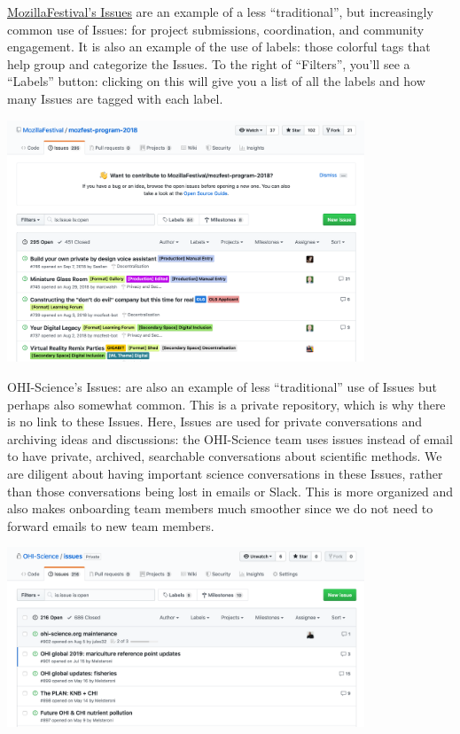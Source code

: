 \documentclass[
  letterpaper,
  DIV=11,
  numbers=noendperiod]{scrreprt}
\begin{document}
\href{https://github.com/MozillaFestival/mozfest-program-2018/issues}{MozillaFestival's
Issues} are an example of a less ``traditional'', but increasingly
common use of Issues: for project submissions, coordination, and
community engagement. It is also an example of the use of labels: those
colorful tags that help group and categorize the Issues. To the right of
``Filters'', you'll see a ``Labels'' button: clicking on this will give
you a list of all the labels and how many Issues are tagged with each
label.

\includegraphics[width=0.8\textwidth,height=\textheight]{./img/issues-mozfest.png}

OHI-Science's Issues: are also an example of less ``traditional'' use of
Issues but perhaps also somewhat common. This is a private repository,
which is why there is no link to these Issues. Here, Issues are used for
private conversations and archiving ideas and discussions: the
OHI-Science team uses issues instead of email to have private, archived,
searchable conversations about scientific methods. We are diligent about
having important science conversations in these Issues, rather than
those conversations being lost in emails or Slack. This is more
organized and also makes onboarding team members much smoother since we
do not need to forward emails to new team members.

\includegraphics[width=0.8\textwidth,height=\textheight]{./img/issues-ohiscience.png}
\end{document}
